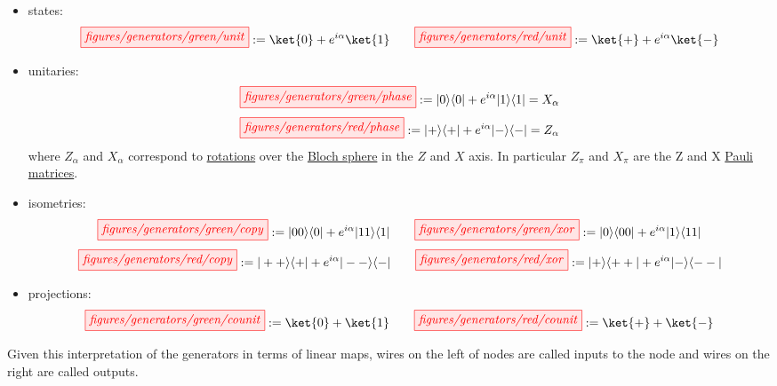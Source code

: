 \documentclass[a4paper, 12pt]{article}
\begin{document}
\begin{itemize}
\item states:
  \begin{equation*}
    \tikzfig{figures/generators/green/unit} := \ket{0} + e^{i \alpha} \ket{1} 
    \qquad
    \tikzfig{figures/generators/red/unit} := \ket{+} + e^{i \alpha} \ket{-}
  \end{equation*}

\item unitaries:
  \begin{equation*}
    \tikzfig{figures/generators/green/phase} := | 0 \rangle \langle 0 | + e^{i \alpha} | 1 \rangle \langle 1 | = X_\alpha
  \end{equation*}
  \vspace{1mm}
  \begin{equation*}
    \tikzfig{figures/generators/red/phase} := | + \rangle \langle + | + e^{i \alpha} | - \rangle \langle - | = Z_\alpha
  \end{equation*}
  where $Z_\alpha$ and $X_\alpha$ correspond to \underline{rotations} over the
  \underline{Bloch sphere}  in the $Z$ and $X$ axis. In particular $Z_\pi$ and
  $X_\pi$ are the Z and X \underline{Pauli matrices}.

\item isometries:
  \begin{equation*}
    \tikzfig{figures/generators/green/copy} := | 00 \rangle \langle 0 | + e^{i \alpha} |11 \rangle \langle 1 |
    \qquad
    \tikzfig{figures/generators/green/xor} := | 0 \rangle \langle 00 | + e^{i \alpha} | 1 \rangle \langle 11 |
  \end{equation*}
  \begin{equation*}
    \tikzfig{figures/generators/red/copy} := | ++ \rangle \langle + | + e^{i \alpha} |-- \rangle \langle - |
    \qquad
    \tikzfig{figures/generators/red/xor} := | + \rangle \langle ++ | + e^{i \alpha} | - \rangle \langle -- |
  \end{equation*}

\item projections:
  \begin{equation*}
    \tikzfig{figures/generators/green/counit} := \ket{0} + \ket{1}
    \qquad
    \tikzfig{figures/generators/red/counit} := \ket{+} + \ket{-}
  \end{equation*}
\end{itemize}

Given this interpretation of the generators in terms of linear maps, wires on
the left of nodes are called inputs to the node and wires
on the right are called outputs.
\end{document}
